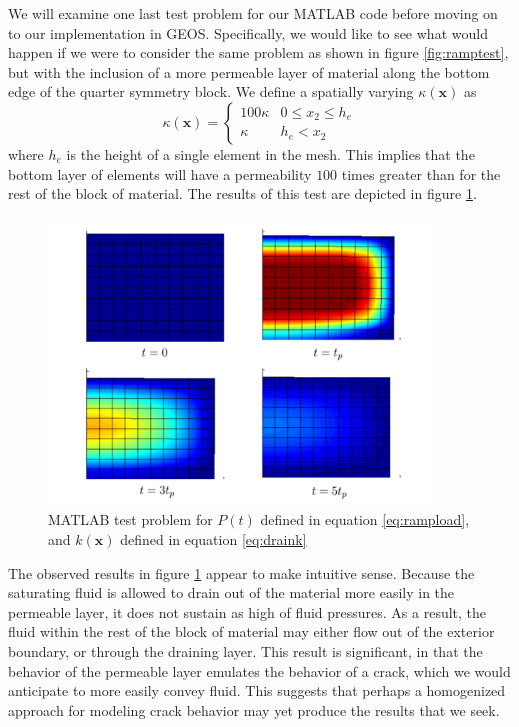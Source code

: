 \documentclass[11pt]{article} %
\begin{document}
We will examine one last test problem for our MATLAB code before moving on to our implementation in GEOS. Specifically, we would like to see what would happen if we were to consider the same problem as shown in figure \ref{fig:ramptest}, but with the inclusion of a more permeable layer of material along the bottom edge of the quarter symmetry block. We define a spatially varying $\kappa(\mathbf{x})$ as
\begin{equation}
	\kappa(\mathbf{x}) =
	\left\{
	\begin{array}{ll}
		100\kappa & 0 \le x_2 \le h_e \\
		\kappa & h_e < x_2
	\end{array}
	\right.
	\label{eq:draink}
\end{equation}
where $h_e$ is the height of a single element in the mesh. This implies that the bottom layer of elements will have a permeability $100$ times greater than for the rest of the block of material. The results of this test are depicted in figure \ref{fig:draintest}.
\begin{figure} [!ht]
	\centering
	\includegraphics[width = 4.0in,trim=70 20 70 20,clip=true]{draintest.pdf}
	\caption{MATLAB test problem for $P(t)$ defined in equation \ref{eq:rampload}, and $k(\mathbf{x})$ defined in equation \ref{eq:draink}}
	\label{fig:draintest}
\end{figure}

The observed results in figure \ref{fig:draintest} appear to make intuitive sense. Because the saturating fluid is allowed to drain out of the material more easily in the permeable layer, it does not sustain as high of fluid pressures. As a result, the fluid within the rest of the block of material may either flow out of the exterior boundary, or through the draining layer. This result is significant, in that the behavior of the permeable layer emulates the behavior of a crack, which we would anticipate to more easily convey fluid. This suggests that perhaps a homogenized approach for modeling crack behavior may yet produce the results that we seek.
\end{document}
